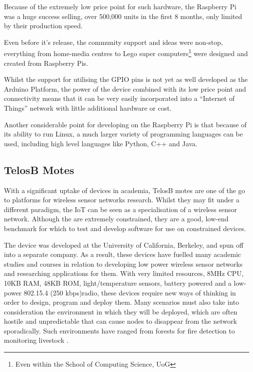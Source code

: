 Because of the extremely low price point for such hardware, the Raspberry Pi was a huge success selling, over 500,000 units in the first 8 months, only limited by their production speed.\cite{RaspberryPiSold}

Even before it's release, the community support and ideas were non-stop, everything from home-media centres\cite{Raspbmc} to Lego super computers\footnote{Even within the School of Computing Science, UoG}\cite{LegoSuperComputer} were designed and created from Raspberry Pis.

Whilst the support for utilising the GPIO pins is not yet as well developed as the Arduino Platform, the power of the device combined with its low price point and connectivity means that it can be very easily incorporated into a ``Internet of Things'' network with little additional hardware or cost.

Another considerable point for developing on the Raspberry Pi is that because of its ability to run Linux, a much larger variety of programming languages can be used, including high level languages like Python, C++ and Java.

\subsection{TelosB Motes} %
\label{sub:telos_b_motes}

With a significant uptake of devices in academia, TelosB motes are one of the go to platforms for wireless sensor networks research. Whilst they may fit under a different paradigm, the IoT can be seen as a specialisation of a wireless sensor network. Although the are extremely constrained, they are a good, low-end benchmark for which to test and develop software for use on constrained devices. 

The device was developed at the University of California, Berkeley, and spun off into a separate company. As a result, these devices have fuelled many academic studies and courses in relation to developing low power wireless sensor networks and researching applications for them. With very limited resources, 8MHz CPU, 10KB RAM, 48KB ROM, light/temperature sensors, battery powered and a low-power 802.15.4 (250 kbps)radio, these devices require new ways of thinking in order to design, program and deploy them. Many scenarios must also take into consideration the environment in which they will be deployed, which are often hostile and unpredictable that can cause nodes to disappear from the network sporadically. Such environments have ranged from forests for fire detection\cite{FireDetection} to monitoring livestock \cite{Livestock}.

